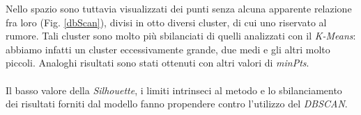 \begin{figure}[H]
\end{figure}
\noindent
Nello spazio sono tuttavia visualizzati dei punti senza alcuna apparente relazione fra loro (Fig. \ref{dbScan}), divisi in otto diversi cluster, di cui uno riservato al rumore. Tali cluster sono molto più sbilanciati di quelli analizzati con il \textit{K-Means}: abbiamo infatti un cluster eccessivamente grande, due medi e gli altri molto piccoli. Analoghi risultati sono stati ottenuti con altri valori di \textit{minPts}.
\\\\
Il basso valore della \textit{Silhouette}, i limiti intrinseci al metodo e lo sbilanciamento dei risultati forniti dal modello fanno propendere contro l’utilizzo del \textit{DBSCAN}.


